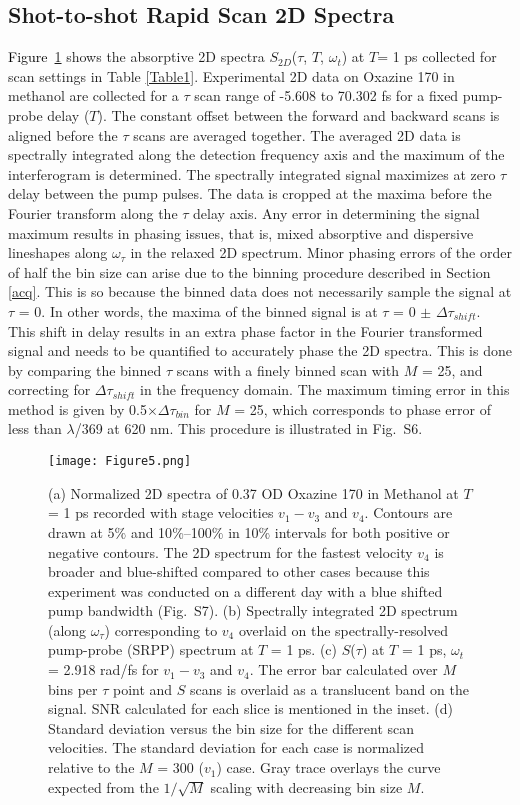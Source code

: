 \documentclass[%
aip,
amsmath,amssymb,
preprint,%
]{revtex4-2}
\newcommand*{\si}[1]{\textcolor{black}{ #1}}
\begin{document}
\subsection{Shot-to-shot Rapid Scan 2D Spectra}\label{rapid2D}
\si{Figure~\ref{fig:fig5}} shows the absorptive 2D spectra $S_{2D}$($\tau$, $T$, $\omega_t$) at $T $= 1 ps collected for scan settings in Table \ref{Table1}. Experimental 2D data on Oxazine 170 in methanol are collected for a $\tau$ scan range of -5.608 to 70.302 fs for a fixed pump-probe delay ($T$). The constant offset between the forward and backward scans is aligned before the $\tau$ scans are averaged together. The averaged 2D data is spectrally integrated along the detection frequency axis and the maximum of the interferogram is determined. The spectrally integrated signal maximizes at zero $\tau$ delay between the pump pulses. The data is cropped at the maxima before the Fourier transform along the $\tau$ delay axis. Any error in determining the signal maximum results in phasing issues, that is, mixed absorptive and dispersive lineshapes along $\omega_{\tau}$ in the relaxed 2D spectrum. Minor phasing errors of the order of half the bin size can arise due to the binning procedure described in Section \ref{acq}. This is so because the binned data does not necessarily sample the signal at $\tau$ = 0. In other words, the maxima of the binned signal is at $\tau$ = 0 $\pm$ $\Delta$$\tau$$_{shift}$. This shift in delay results in an extra phase factor in the Fourier transformed signal and needs to be quantified to accurately phase the 2D spectra. This is done by comparing the binned $\tau$ scans with a finely binned scan with $M$ = 25, and correcting for $\Delta$$\tau$$_{shift}$ in the frequency domain. The maximum timing error in this method is given by 0.5$\times$$\Delta\tau_{bin}$ for $M$ = 25, which corresponds to phase error of less than $\lambda$/369 at 620 nm. This procedure is illustrated in Fig.~S6.


\begin{figure}[h!]
\centering\texttt{[image: Figure5.png]}
\caption{(a) Normalized 2D spectra of 0.37 OD Oxazine 170 in Methanol at $T$ = 1 ps recorded with stage velocities $v_1-v_3$ and $v_4$. Contours are drawn at 5$\%$ and 10$\%$–100$\%$ in 10$\%$ intervals for both positive or negative contours. The 2D spectrum for the fastest velocity $v_4$ is broader and blue-shifted compared to other cases because this experiment was conducted on a different day with a blue shifted pump bandwidth (Fig.~S7). (b) Spectrally integrated 2D spectrum (along $\omega_{\tau}$) corresponding to $v_4$ overlaid on the spectrally-resolved pump-probe (SRPP) spectrum at $T$ = 1 ps. (c) $S$($\tau$) at $T$ = 1 ps, $\omega_t$ = 2.918 rad/fs for $v_1-v_3$ and $v_4$. The error bar calculated over $M$ bins per $\tau$ point and $S$ scans is overlaid as a translucent band on the signal. SNR calculated for each slice is mentioned in the inset. (d) Standard deviation versus the bin size for the different scan velocities. The standard deviation for each case is normalized relative to the $M$ = 300 ($v_1$) case. Gray trace overlays the curve expected from the $1/\sqrt M$ scaling with decreasing bin size $M$.}
\label{fig:fig5}
\end{figure}
\end{document}
